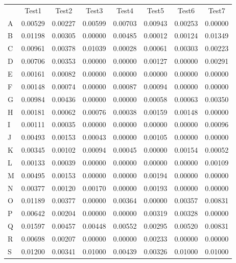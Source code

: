 \begin{tabularx}{\textwidth}{X|c|c|c|c|c|c|c}
 & Test1 & Test2 & Test3 & Test4 & Test5 & Test6 & Test7 \\%
A & 0.00529 &  0.00227 &  0.00599 &  0.00703 &  0.00943 &  0.00253 &  0.00000  \\
B & 0.01198 &  0.00305 &  0.00000 &  0.00485 &  0.00012 &  0.00124 &  0.01349  \\
C & 0.00961 &  0.00378 &  0.01039 &  0.00028 &  0.00061 &  0.00303 &  0.00223  \\
D & 0.00706 &  0.00353 &  0.00000 &  0.00000 &  0.00127 &  0.00000 &  0.00291  \\
E & 0.00161 &  0.00082 &  0.00000 &  0.00000 &  0.00000 &  0.00000 &  0.00000  \\
F & 0.00148 &  0.00074 &  0.00000 &  0.00087 &  0.00094 &  0.00000 &  0.00000  \\
G & 0.00984 &  0.00436 &  0.00000 &  0.00000 &  0.00058 &  0.00063 &  0.00350  \\
H & 0.00181 &  0.00062 &  0.00076 &  0.00038 &  0.00159 &  0.00148 &  0.00000  \\
I & 0.00111 &  0.00035 &  0.00000 &  0.00000 &  0.00000 &  0.00000 &  0.00096  \\
J & 0.00493 &  0.00153 &  0.00043 &  0.00000 &  0.00105 &  0.00000 &  0.00000  \\
K & 0.00345 &  0.00102 &  0.00094 &  0.00045 &  0.00000 &  0.00154 &  0.00052  \\
L & 0.00133 &  0.00039 &  0.00000 &  0.00000 &  0.00000 &  0.00000 &  0.00109  \\
M & 0.00495 &  0.00153 &  0.00000 &  0.00000 &  0.00194 &  0.00000 &  0.00000  \\
N & 0.00377 &  0.00120 &  0.00170 &  0.00000 &  0.00193 &  0.00000 &  0.00000  \\
O & 0.01189 &  0.00377 &  0.00000 &  0.00364 &  0.00000 &  0.00357 &  0.00831  \\
P & 0.00642 &  0.00204 &  0.00000 &  0.00000 &  0.00319 &  0.00328 &  0.00000  \\
Q & 0.01597 &  0.00457 &  0.00448 &  0.00552 &  0.00295 &  0.00520 &  0.00831  \\
R & 0.00698 &  0.00207 &  0.00000 &  0.00000 &  0.00233 &  0.00000 &  0.00000  \\
S & 0.01200 &  0.00341 &  0.01000 &  0.00439 &  0.00326 &  0.01000 &  0.01000  \\

\end{tabularx}
